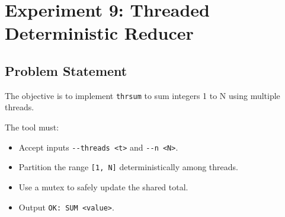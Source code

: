 
\section{Experiment 9: Threaded Deterministic Reducer}

\subsection{Problem Statement}
The objective is to implement \texttt{thrsum} to sum integers 1 to N using multiple threads.

The tool must:
\begin{itemize}
    \item Accept inputs \verb|--threads <t>| and \verb|--n <N>|.
    \item Partition the range \verb|[1, N]| deterministically among threads.
    \item Use a mutex to safely update the shared total.
    \item Output \verb|OK: SUM <value>|.
\end{itemize}

